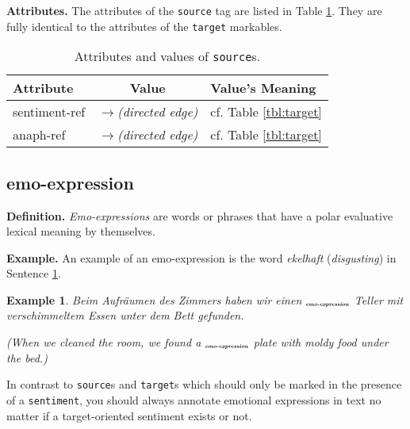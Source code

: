 \documentclass[11pt,a4paper]{article}
\newlength{\clmnwidth}
\theoremstyle{mytheoremstyle}
\newtheorem{exmp}{Example}[section]
\newcommand{\mtag}[2]{{\upshape[\emph{#2}\upshape]$_{\textrm{\bfseries\emph{\tiny
        #1}}}$}}
\newcommand{\emoexpression}[2][]{\mtag{emo-\-ex\-pression\ifstrempty{#1}{}{:#1}}{#2}}
\begin{document}
\noindent\textbf{Attributes.} The attributes of the \texttt{source}
tag are listed in Table \ref{tbl:source}.  They are fully identical to
the attributes of the \texttt{target} markables.
\begin{center}
  \begin{table}[h]
    \caption{Attributes and values of \texttt{source}s.}
    \begin{tabular}{|l|c|p{0.935\clmnwidth}|}\hline
      Attribute & Value & Value's Meaning\\\hline

      sentiment-ref & \textit{$\longrightarrow$\newline(directed
        edge)} & cf. Table \ref{tbl:target}\\\hline

      anaph-ref & \textit{$\longrightarrow$\newline(directed edge)} &
      cf. Table \ref{tbl:target}\\\hline
    \end{tabular}\label{tbl:source}
  \end{table}
\end{center}

\subsection{emo-expression}
\noindent\textbf{Definition.} \emph{Emo-expressions} are words or
phrases that have a polar evaluative lexical meaning by themselves.

\noindent\textbf{Example.} An example of an emo-expression is the word
\textit{ekelhaft} (\textit{disgusting}) in Sentence
\ref{exmp:emo-expr1}.
\begin{exmp}
  Beim Aufr\"aumen des Zimmers haben wir einen
  \emoexpression{ekelhaften} Teller mit verschimmeltem Essen unter dem
  Bett gefunden.

  (When we cleaned the room, we found a \emoexpression{disgusting}
  plate with moldy food under the bed.)\label{exmp:emo-expr1}
\end{exmp}

In contrast to \texttt{source}s and \texttt{target}s which should only
be marked in the presence of a \texttt{sentiment}, you should always
annotate emotional expressions in text no matter if a target-oriented
sentiment exists or not.
\end{document}

